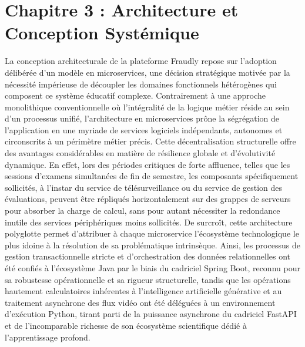 \section{Chapitre 3 : Architecture et Conception Systémique}

La conception architecturale de la plateforme Fraudly repose sur l'adoption délibérée d'un modèle en microservices, une décision stratégique motivée par la nécessité impérieuse de découpler les domaines fonctionnels hétérogènes qui composent ce système éducatif complexe. Contrairement à une approche monolithique conventionnelle où l'intégralité de la logique métier réside au sein d'un processus unifié, l'architecture en microservices prône la ségrégation de l'application en une myriade de services logiciels indépendants, autonomes et circonscrits à un périmètre métier précis. Cette décentralisation structurelle offre des avantages considérables en matière de résilience globale et d'évolutivité dynamique. En effet, lors des périodes critiques de forte affluence, telles que les sessions d'examens simultanées de fin de semestre, les composants spécifiquement sollicités, à l'instar du service de télésurveillance ou du service de gestion des évaluations, peuvent être répliqués horizontalement sur des grappes de serveurs pour absorber la charge de calcul, sans pour autant nécessiter la redondance inutile des services périphériques moins sollicités. De surcroît, cette architecture polyglotte permet d'attribuer à chaque microservice l'écosystème technologique le plus idoine à la résolution de sa problématique intrinsèque. Ainsi, les processus de gestion transactionnelle stricte et d'orchestration des données relationnelles ont été confiés à l'écosystème Java par le biais du cadriciel Spring Boot, reconnu pour sa robustesse opérationnelle et sa rigueur structurelle, tandis que les opérations hautement calculatoires inhérentes à l'intelligence artificielle générative et au traitement asynchrone des flux vidéo ont été déléguées à un environnement d'exécution Python, tirant parti de la puissance asynchrone du cadriciel FastAPI et de l'incomparable richesse de son écosystème scientifique dédié à l'apprentissage profond.

